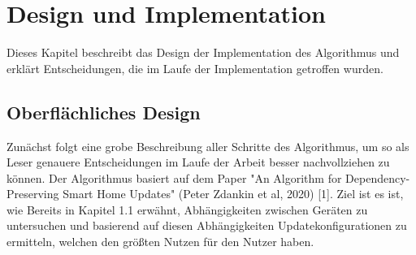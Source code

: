\chapter{Design und Implementation}\label{ch:eval}

Dieses Kapitel beschreibt das Design der Implementation des Algorithmus und erklärt Entscheidungen, die im
Laufe der Implementation getroffen wurden.

\section{Oberflächliches Design}

Zunächst folgt eine grobe Beschreibung aller Schritte des Algorithmus, um so als Leser genauere Entscheidungen im Laufe der Arbeit
besser nachvollziehen zu können. Der Algorithmus basiert auf dem Paper "An Algorithm for Dependency-Preserving Smart
Home Updates" (Peter Zdankin et al, 2020) [1]. Ziel ist es
ist, wie Bereits in Kapitel 1.1 erwähnt, Abhängigkeiten zwischen Geräten zu untersuchen und basierend auf diesen Abhängigkeiten
Updatekonfigurationen zu ermitteln, welchen den größten Nutzen für den Nutzer haben. 
